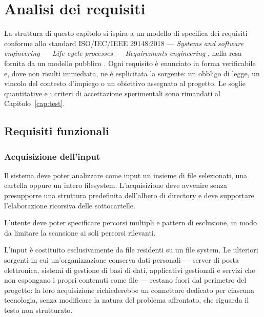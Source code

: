 \chapter{Analisi dei requisiti}
\label{cap:requisiti}

La struttura di questo capitolo si ispira a un modello di specifica dei requisiti conforme allo standard ISO/IEC/IEEE 29148:2018 --- \textit{Systems and software engineering --- Life cycle processes --- Requirements engineering} \cite{iso29148SystemsSoftwareEngineering2018}, nella resa fornita da un modello pubblico \cite{IEEE29148SRSLaTeXTemplateIEEE291482018SRSTemplatetexMain}. Ogni requisito è enunciato in forma verificabile e, dove non risulti immediata, ne è esplicitata la sorgente: un obbligo di legge, un vincolo del contesto d'impiego o un obiettivo assegnato al progetto. Le soglie quantitative e i criteri di accettazione sperimentali sono rimandati al Capitolo~\ref{cap:test}.


\section{Requisiti funzionali}
\label{sec:requisiti-funzionali}

\subsection{Acquisizione dell'input}
\label{sub:acquisizione-input}
Il sistema deve poter analizzare come input un insieme di file selezionati, una cartella oppure un intero filesystem. L'acquisizione deve avvenire senza presupporre una struttura predefinita dell'albero di directory e deve supportare l'elaborazione ricorsiva delle sottocartelle. \medskip

L'utente deve poter specificare percorsi multipli e pattern di esclusione, in modo da limitare la scansione ai soli percorsi rilevanti. \medskip

L'input è costituito esclusivamente da file residenti su un file system. Le ulteriori sorgenti in cui un'organizzazione conserva dati personali --- server di posta elettronica, sistemi di gestione di basi di dati, applicativi gestionali e servizi che non espongano i propri contenuti come file --- restano fuori dal perimetro del progetto: la loro acquisizione richiederebbe un connettore dedicato per ciascuna tecnologia, senza modificare la natura del problema affrontato, che riguarda il testo non strutturato.

